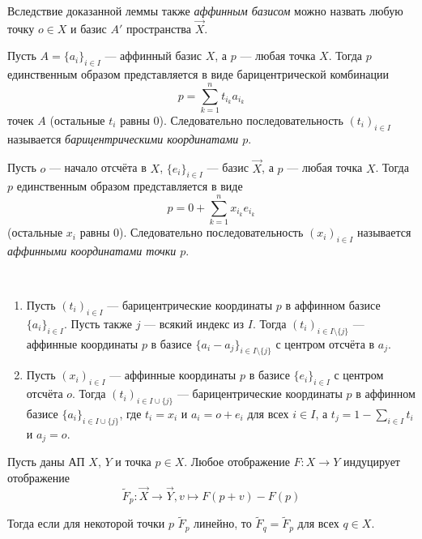 \documentclass[12pt,a4paper]{article}
\begin{document}
    \begin{remark}
        Вследствие доказанной леммы также \emph{аффинным базисом} можно назвать любую точку $o \in X$ и базис $A'$ пространства $\overrightarrow{X}$.
    \end{remark}

    \begin{definition}
        Пусть $A = \{a_i\}_{i \in I}$ --- аффинный базис $X$, а $p$ --- любая точка $X$. Тогда $p$ единственным образом представляется в виде барицентрической комбинации
        \[p = \sum_{k=1}^n t_{i_k} a_{i_k}\]
        точек $A$ (остальные $t_i$ равны $0$). Следовательно последовательность $(t_i)_{i \in I}$ называется \emph{барицентрическими координатами $p$}.
    \end{definition}

    \begin{definition}
        Пусть $o$ --- начало отсчёта в $X$, $\{e_i\}_{i \in I}$ --- базис $\overrightarrow{X}$, а $p$ --- любая точка $X$. Тогда $p$ единственным образом представляется в виде
        \[p = 0 + \sum_{k=1}^n x_{i_k} e_{i_k}\]
        (остальные $x_i$ равны $0$). Следовательно последовательность $(x_i)_{i \in I}$ называется \emph{аффинными координатами точки $p$}.
    \end{definition}

    \begin{lemma}\ 
        \begin{enumerate}
            \item Пусть $(t_i)_{i \in I}$ --- барицентрические координаты $p$ в аффинном базисе $\{a_i\}_{i \in I}$. Пусть также $j$ --- всякий индекс из $I$. Тогда $(t_i)_{i \in I \setminus \{j\}}$ --- аффинные координаты $p$ в базисе $\{a_i - a_j\}_{i \in I \setminus \{j\}}$ с центром отсчёта в $a_j$.
            \item Пусть $(x_i)_{i \in I}$ --- аффинные координаты $p$ в базисе $\{e_i\}_{i \in I}$ с центром отсчёта $o$. Тогда $(t_i)_{i \in I \cup \{j\}}$ --- барицентрические координаты $p$ в аффинном базисе $\{a_i\}_{i \in I \cup \{j\}}$, где $t_i = x_i$ и $a_i = o + e_i$ для всех $i \in I$, а $t_j = 1 - \sum_{i \in I} t_i$ и $a_j = o$.
        \end{enumerate}
    \end{lemma}

    \begin{theorem}
        Пусть даны АП $X$, $Y$ и точка $p \in X$. Любое отображение $F: X \to Y$ индуцирует отображение
        \[\widetilde{F}_p: \overrightarrow{X} \to \overrightarrow{Y}, v \mapsto F(p+v) - F(p)\]

        Тогда если для некоторой точки $p$ $\widetilde{F}_p$ линейно, то $\widetilde{F}_q = \widetilde{F}_p$ для всех $q \in X$.
    \end{theorem}
\end{document}
